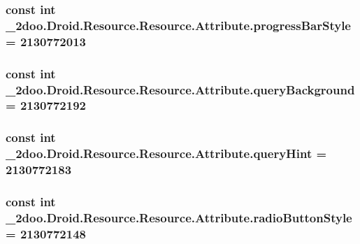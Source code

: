 \hypertarget{class__2doo_1_1_droid_1_1_resource_1_1_attribute_0d072cbf0996afb4f1de77dfdb72e69c}{
\subsubsection[{progressBarStyle}]{\setlength{\rightskip}{0pt plus 5cm}const int \_\-2doo.Droid.Resource.Resource.Attribute.progressBarStyle = 2130772013}}
\label{class__2doo_1_1_droid_1_1_resource_1_1_attribute_0d072cbf0996afb4f1de77dfdb72e69c}


\hypertarget{class__2doo_1_1_droid_1_1_resource_1_1_attribute_bc5b06e4d0a81f1565f16d94cb4b4a38}{
\subsubsection[{queryBackground}]{\setlength{\rightskip}{0pt plus 5cm}const int \_\-2doo.Droid.Resource.Resource.Attribute.queryBackground = 2130772192}}
\label{class__2doo_1_1_droid_1_1_resource_1_1_attribute_bc5b06e4d0a81f1565f16d94cb4b4a38}


\hypertarget{class__2doo_1_1_droid_1_1_resource_1_1_attribute_3145cf26af6d4a64307f2687b270d4d8}{
\subsubsection[{queryHint}]{\setlength{\rightskip}{0pt plus 5cm}const int \_\-2doo.Droid.Resource.Resource.Attribute.queryHint = 2130772183}}
\label{class__2doo_1_1_droid_1_1_resource_1_1_attribute_3145cf26af6d4a64307f2687b270d4d8}


\hypertarget{class__2doo_1_1_droid_1_1_resource_1_1_attribute_0272fed8cb11ae2d9642c730bf56b602}{
\subsubsection[{radioButtonStyle}]{\setlength{\rightskip}{0pt plus 5cm}const int \_\-2doo.Droid.Resource.Resource.Attribute.radioButtonStyle = 2130772148}}
\label{class__2doo_1_1_droid_1_1_resource_1_1_attribute_0272fed8cb11ae2d9642c730bf56b602}


